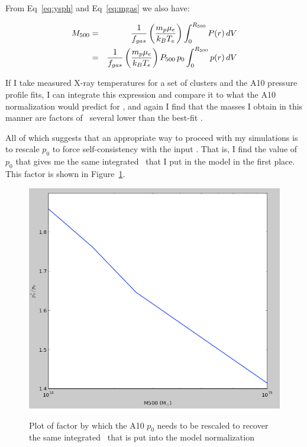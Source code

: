 From Eq~\ref{eq:ysph} and Eq~\ref{eq:mgas} we also have:

\begin{eqnarray}
\M500 &=& {1\over{f_{gas}}}\left({{m_p\mu_e}\over{k_B T_e}}\right)\integral{\R500}{0}{P(r)}{V}\\
&=& {1\over{f_{gas}}}\left({{m_p\mu_e}\over{k_B T_e}}\right)\P500\,p_0\integral{\R500}{0}{p(r)}{V}
\end{eqnarray}

If I take measured X-ray temperatures for a set of clusters and the
A10 pressure profile fits, I can integrate this expression and
compare it to what the A10 normalization would predict for ,
and again I find that the masses I obtain in this manner are factors
of ~several lower than the best-fit .  

All of which suggests that an appropriate way to proceed with my
simulations is to rescale $p_0$ to force self-consistency with the
input .  That is, I find the value of $p_0$ that gives me the
same integrated \ that I put in the model in the first place.
This factor is shown in Figure~\ref{fig:rescale}.

\begin{figure}[th]
\begin{center}
\includegraphics[scale=0.5]{figures/rescale.png}\\
\end{center}
\caption{Plot of factor by which the A10 $p_0$ needs to be rescaled to
  recover the same integrated \ that is put into the model normalization}
\label{fig:rescale}
\end{figure}



